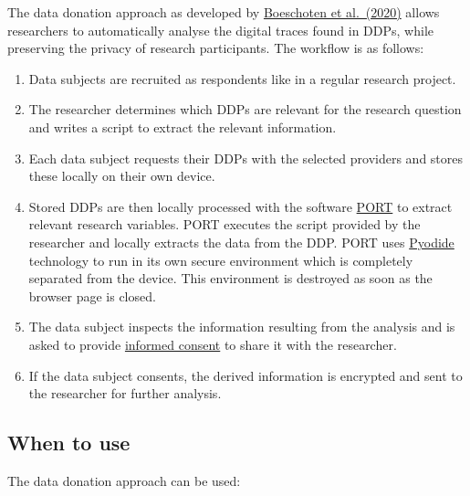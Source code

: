 \documentclass[
]{book}
\providecommand{\tightlist}{%
  \setlength{\itemsep}{0pt}\setlength{\parskip}{0pt}}
\begin{document}
The data donation approach as developed by
\href{https://doi.org/10.48550/arXiv.2011.09851}{Boeschoten et al.~(2020)}
allows researchers to automatically analyse the digital traces found in DDPs,
while preserving the privacy of research participants. The workflow is as follows:

\begin{enumerate}
\def\labelenumi{\arabic{enumi}.}
\tightlist
\item
  Data subjects are recruited as respondents like in a regular research project.
\item
  The researcher determines which DDPs are relevant for the research question
  and writes a script to extract the relevant information.
\item
  Each data subject requests their DDPs with the selected providers and stores
  these locally on their own device.
\item
  Stored DDPs are then locally processed with the software
  \href{https://github.com/eyra/port}{PORT} to extract relevant
  research variables. PORT executes the script provided by the researcher and
  locally extracts the data from the DDP. PORT uses
  \href{https://pyodide.org/en/stable}{Pyodide} technology to run in
  its own secure environment which is completely separated from the device. This
  environment is destroyed as soon as the browser page is closed.
\item
  The data subject inspects the information resulting from the analysis and is
  asked to provide \protect\hyperlink{informed-consent-forms}{informed consent} to share it with
  the researcher.
\item
  If the data subject consents, the derived information is encrypted and sent
  to the researcher for further analysis.
\end{enumerate}

\hypertarget{data-donation-when}{%
\subsection{When to use}\label{data-donation-when}}

The data donation approach can be used:
\end{document}
